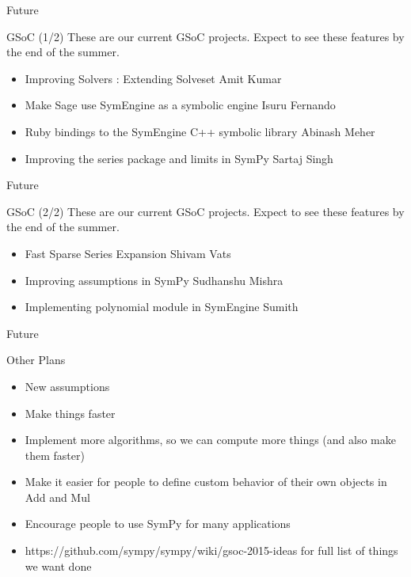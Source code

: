 \documentclass[xcolor=svgnames]{beamer}
\begin{document}
  \begin{frame}{Future}
    \begin{block}{GSoC (1/2)}
      These are our current GSoC projects. Expect to see these features by the end
      of the summer.
      \begin{itemize}
      \item \normalsize Improving Solvers : Extending Solveset \small Amit Kumar
      \item \normalsize Make Sage use SymEngine as a symbolic engine \small Isuru Fernando
      \item \normalsize Ruby bindings to the SymEngine C++ symbolic library \small Abinash Meher
      \item \normalsize Improving the series package and limits in SymPy \small Sartaj Singh
      
      \end{itemize}
    \end{block}
  \end{frame}

  \begin{frame}{Future}
    \begin{block}{GSoC (2/2)}
      These are our current GSoC projects. Expect to see these features by the end
      of the summer.
      \begin{itemize}
      \item \normalsize Fast Sparse Series Expansion \small Shivam Vats
      \item \normalsize Improving assumptions in SymPy \small Sudhanshu Mishra
      \item \normalsize Implementing polynomial module in SymEngine \small Sumith

      \end{itemize}
    \end{block}
  \end{frame}

  \begin{frame}{Future}
  \begin{block}{Other Plans}
  \begin{itemize}
  \item New assumptions
  \item Make things faster
  \item Implement more algorithms, so we can compute more things (and also make
    them faster)
  \item Make it easier for people to define custom behavior of their own objects
    in Add and Mul
  \item Encourage people to use SymPy for many applications
  \item https://github.com/sympy/sympy/wiki/gsoc-2015-ideas for full list of
    things we want done
  \end{itemize}
  \end{block}
  \end{frame}
\end{document}
